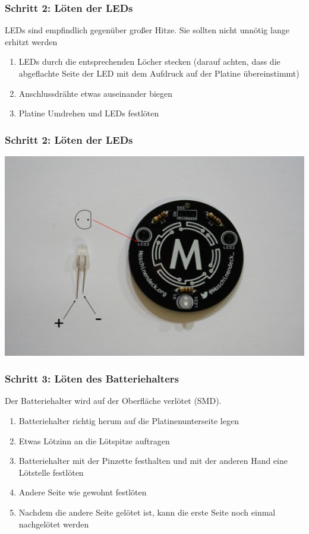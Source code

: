 \documentclass[10pt]{beamer}
\begin{document}
	\begin{frame}
	\frametitle{Schritt 2: Löten der LEDs}
	LEDs sind empfindlich gegenüber großer Hitze. Sie sollten nicht unnötig lange erhitzt werden
	\begin{enumerate} 
		\item{LEDs durch die entsprechenden Löcher stecken (darauf achten, dass die abgeflachte Seite der LED mit dem Aufdruck auf der Platine übereinstimmt)}
		\item{Anschlussdrähte etwas auseinander biegen}
		\item{Platine Umdrehen und LEDs festlöten}
	\end{enumerate}
	\end{frame}

	\begin{frame}
		\frametitle{Schritt 2: Löten der LEDs}
		\includegraphics[width=\linewidth]{images/badge18/ledPolarity.JPG}
	\end{frame}

	\begin{frame}
	\frametitle{Schritt 3: Löten des Batteriehalters}
	Der Batteriehalter wird auf der Oberfläche verlötet (SMD).
	\begin{enumerate} 
		\item{Batteriehalter richtig herum auf die Platinenunterseite legen}
		\item{Etwas Lötzinn an die Lötspitze auftragen}
		\item{Batteriehalter mit der Pinzette festhalten und mit der anderen Hand eine Lötstelle festlöten}
		\item{Andere Seite wie gewohnt festlöten}
		\item{Nachdem die andere Seite gelötet ist, kann die erste Seite noch einmal nachgelötet werden}
	\end{enumerate}
	\end{frame}
\end{document}
